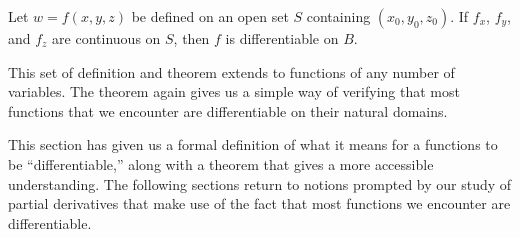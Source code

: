 \begin{theorem}\label{thm:differentiable3}%
Let $w=f(x,y,z)$ be defined on an open set $S$ containing $(x_0,y_0,z_0)$. If $f_x$, $f_y$, and $f_z$ are continuous on $S$, then $f$ is differentiable on $B$.
\end{theorem}

This set of definition and theorem extends to functions of any number of variables. The theorem again gives us a simple way of verifying that most functions that we encounter are differentiable on their natural domains.\bigskip

This section has given us a formal definition of what it means for a functions to be ``differentiable,'' along with a theorem that gives a more accessible understanding. The following sections return to notions prompted by our study of partial derivatives that make use of the fact that most functions we encounter are differentiable.

